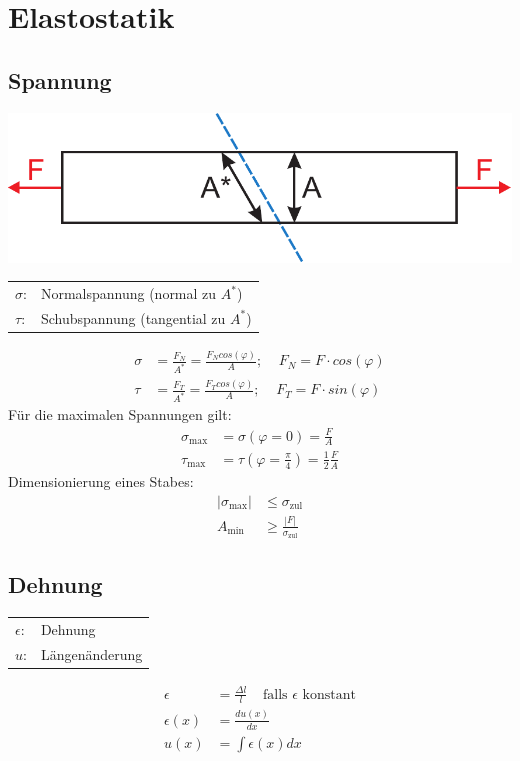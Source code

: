 \documentclass[a4paper,twocolumn,10pt]{article}
\begin{document}
\section{Elastostatik}

\subsection{Spannung}
\begin{center}
\includegraphics[width=0.65\columnwidth]{Grafiken/Stab_Spannung}
\end{center}
\begin{tabular}{ll}
$\sigma$: & Normalspannung (normal zu $A^*$)\\
$\tau$: & Schubspannung (tangential zu $A^*$)
\end{tabular}
\begin{equation*}
\begin{split}
\sigma&=\frac{F_N}{A^*}=\frac{F_Ncos(\varphi)}{A};\;\;\;\;F_N=F\cdot cos(\varphi)\\
\tau&=\frac{F_T}{A^*}=\frac{F_Tcos(\varphi)}{A};\;\;\;\;F_T=F\cdot sin(\varphi)
\end{split}
\end{equation*}
Für die maximalen Spannungen gilt:
\begin{equation*}
\begin{split}
\sigma_{\text{max}}&=\sigma(\varphi=0)=\frac{F}{A}\\
\tau_{\text{max}}&=\tau\left(\varphi=\frac{\pi}{4}\right)=\frac{1}{2}\frac{F}{A}
\end{split}
\end{equation*}
Dimensionierung eines Stabes:
\begin{equation*}
\begin{split}
|\sigma_{\text{max}}|&\leq\sigma_{\text{zul}}\\
A_{\text{min}}&\geq\frac{|F|}{\sigma_{\text{zul}}}
\end{split}
\end{equation*}

\subsection{Dehnung}
\begin{tabular}{ll}
$\epsilon$: & Dehnung\\
$u$: & Längenänderung
\end{tabular}
\begin{equation*}
\begin{split}
\epsilon&=\frac{\Delta l}{l}\;\;\;\;\text{falls }\epsilon\text{ konstant}\\
\epsilon(x)&=\frac{du(x)}{dx}\\
u(x)&=\int\epsilon(x)dx
\end{split}
\end{equation*}
\end{document}
